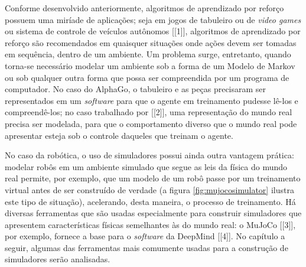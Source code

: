 \documentclass[cic,tc]{iiufrgs}
\begin{document}
Conforme desenvolvido anteriormente, algoritmos de aprendizado por reforço
possuem uma miríade de aplicações; seja em jogos de tabuleiro ou de
\textit{video games} ou sistema de controle de veículos autônomos [[1]],
algoritmos de aprendizado por reforço são recomendados em quaisquer situações
onde ações devem ser tomadas em sequência, dentro de um ambiente. Um problema
surge, entretanto, quando torna-se necessário modelar um ambiente sob a forma de
um Modelo de Markov ou sob qualquer outra forma que possa ser compreendida por
um programa de computador. No caso do AlphaGo, o tabuleiro e as peças precisaram
ser representados em um \textit{software} para que o agente em treinamento
pudesse lê-los e compreendê-los; no caso trabalhado por [[2]], uma representação
do mundo real precisa ser modelada, para que o comportamento diverso que o mundo
real pode apresentar esteja sob o controle daqueles que treinam o agente.


No caso da robótica, o uso de simuladores possui ainda outra vantagem prática:
modelar robôs em um ambiente simulado que segue as leis da física do mundo real
permite, por exemplo, que um modelo de um robô passe por um treinamento virtual
antes de ser construído de verdade (a figura \ref{fig:mujocosimulator} ilustra
este tipo de situação), acelerando, desta maneira, o processo de treinamento. Há
diversas ferramentas que são usadas especialmente para construir simuladores que
apresentem características físicas semelhantes às do mundo real: o MuJoCo [[3]],
por exemplo, fornece a base para o \textit{software} da DeepMind [[4]]. No
capítulo a seguir, algumas das ferramentas mais comumente usadas para a
construção de simuladores serão analisadas.
%
\end{document}
